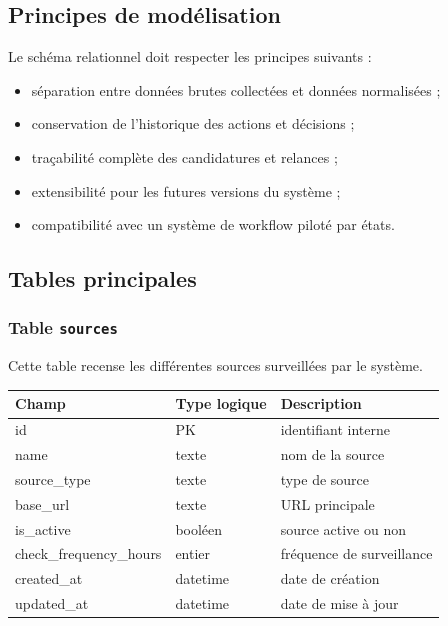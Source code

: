\documentclass[11pt,a4paper]{article}
\begin{document}
\subsection{Principes de modélisation}

Le schéma relationnel doit respecter les principes suivants :

\begin{itemize}
    \item séparation entre données brutes collectées et données normalisées ;
    \item conservation de l’historique des actions et décisions ;
    \item traçabilité complète des candidatures et relances ;
    \item extensibilité pour les futures versions du système ;
    \item compatibilité avec un système de workflow piloté par états.
\end{itemize}

\subsection{Tables principales}

\subsubsection{Table \texttt{sources}}

Cette table recense les différentes sources surveillées par le système.

\begin{center}
\begin{tabular}{|l|l|l|}
\hline
\textbf{Champ} & \textbf{Type logique} & \textbf{Description} \\
\hline
id & PK & identifiant interne \\
name & texte & nom de la source \\
source_type & texte & type de source \\
base_url & texte & URL principale \\
is_active & booléen & source active ou non \\
check_frequency_hours & entier & fréquence de surveillance \\
created_at & datetime & date de création \\
updated_at & datetime & date de mise à jour \\
\hline
\end{tabular}
\end{center}
\end{document}
